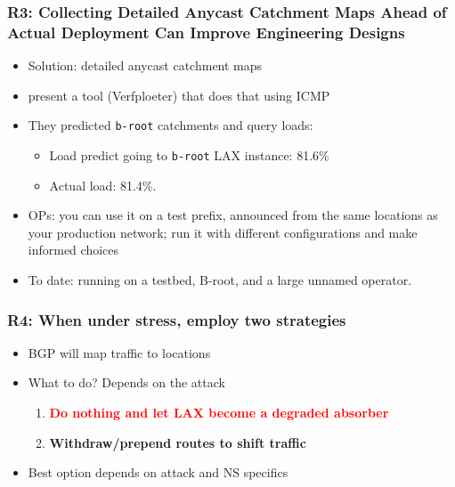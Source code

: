 \documentclass[11pt,show 
notes,notheorems,noamsthm,blank]{beamer} %
\begin{document}
\begin{frame}
 \frametitle{R3: Collecting Detailed Anycast Catchment Maps Ahead of Actual
    Deployment Can Improve Engineering Designs}
    
\begin{itemize}
 \item Solution: detailed anycast catchment maps
 \item \cite{Vries17b} present a tool (Verfploeter) that does that using ICMP
 \item They predicted \texttt{b-root} catchments and  query loads:
 \begin{itemize}
  \item  Load predict going to \texttt{b-root} LAX instance: 81.6\% 
  \item Actual load: 81.4\%.
 \end{itemize}
 \item OPs: you can use it on a test prefix, announced from the same locations 
as your production network; run it with different configurations and make 
informed choices

\item To date: running on a testbed, B-root, and a large unnamed operator. 
 
\end{itemize}


    
\end{frame}

\begin{frame}
 \frametitle{R4: When under stress, employ two strategies}
 \begin{figure}
\centering

  
  \label{fig:nl-deployment}

\end{figure}



\pause
\begin{itemize}
 \item BGP will map traffic to locations
 \item What to do? Depends on the attack
 \begin{enumerate}
   \item \textcolor{red}{\textbf{Do nothing and let LAX become a degraded 
absorber} }

\pause
   \item \textcolor{inlinks}{\textbf{Withdraw/prepend routes to shift traffic  }}

 \end{enumerate}
\pause
 \item Best option depends on attack and NS specifics
\end{itemize}


\end{frame}
\end{document}
